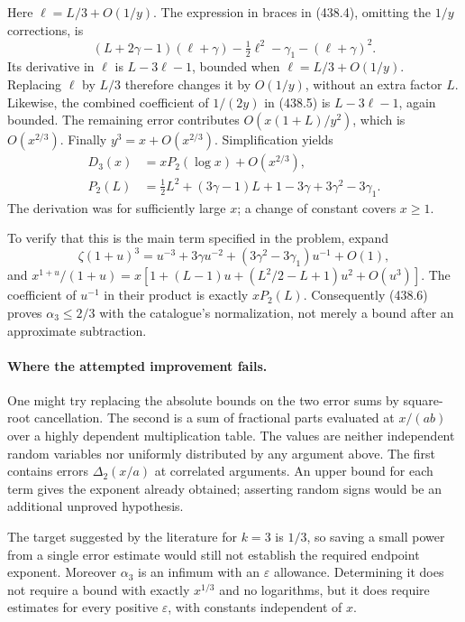 \documentclass[11pt]{article}
\begin{document}
Here $\ell=L/3+O(1/y)$. The expression in braces in (438.4), omitting the $1/y$ corrections, is
\[
 (L+2\gamma-1)(\ell+\gamma)-\tfrac12\ell^2-\gamma_1-(\ell+\gamma)^2.
\]
Its derivative in $\ell$ is $L-3\ell-1$, bounded when $\ell=L/3+O(1/y)$. Replacing $\ell$ by $L/3$ therefore changes it by $O(1/y)$, without an extra factor $L$. Likewise, the combined coefficient of $1/(2y)$ in (438.5) is $L-3\ell-1$, again bounded. The remaining error contributes $O(x(1+L)/y^2)$, which is $O(x^{2/3})$. Finally $y^3=x+O(x^{2/3})$. Simplification yields
\[
 \begin{split}
 D_3(x)&=xP_2(\log x)+O(x^{2/3}),\\
 P_2(L)&=\tfrac12L^2+(3\gamma-1)L
              +1-3\gamma+3\gamma^2-3\gamma_1.
 \end{split} \tag{438.6}
\]
The derivation was for sufficiently large $x$; a change of constant covers $x\ge1$.

To verify that this is the main term specified in the problem, expand
\[
 \zeta(1+u)^3=u^{-3}+3\gamma u^{-2}
                       +(3\gamma^2-3\gamma_1)u^{-1}+O(1),
\]
and $x^{1+u}/(1+u)=x[1+(L-1)u+(L^2/2-L+1)u^2+O(u^3)]$. The coefficient of $u^{-1}$ in their product is exactly $xP_2(L)$. Consequently (438.6) proves $\alpha_3\le2/3$ with the catalogue's normalization, not merely a bound after an approximate subtraction.

\paragraph{Where the attempted improvement fails.}
One might try replacing the absolute bounds on the two error sums by square-root cancellation. The second is a sum of fractional parts evaluated at $x/(ab)$ over a highly dependent multiplication table. The values are neither independent random variables nor uniformly distributed by any argument above. The first contains errors $\Delta_2(x/a)$ at correlated arguments. An upper bound for each term gives the exponent already obtained; asserting random signs would be an additional unproved hypothesis.

The target suggested by the literature for $k=3$ is $1/3$, so saving a small power from a single error estimate would still not establish the required endpoint exponent. Moreover $\alpha_3$ is an infimum with an $\varepsilon$ allowance. Determining it does not require a bound with exactly $x^{1/3}$ and no logarithms, but it does require estimates for every positive $\varepsilon$, with constants independent of $x$.
\end{document}
